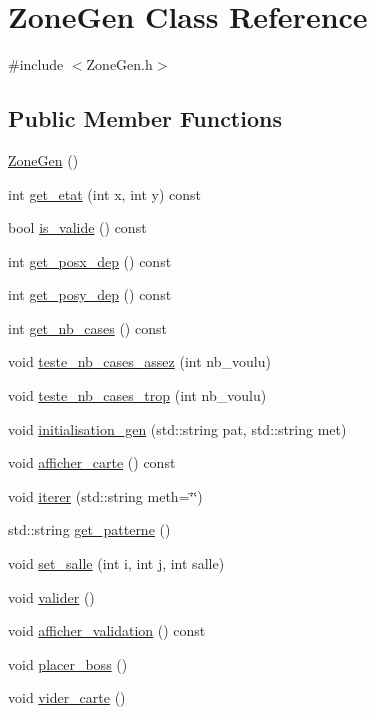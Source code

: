 \hypertarget{classZoneGen}{}\section{Zone\+Gen Class Reference}
\label{classZoneGen}


{\ttfamily \#include $<$Zone\+Gen.\+h$>$}

\subsection*{Public Member Functions}
\begin{DoxyCompactItemize}
\item 
\hyperlink{classZoneGen_aae2af3fc6b6db23a7b1f7091115ef392}{Zone\+Gen} ()
\item 
int \hyperlink{classZoneGen_a893e3c5d0ae5ecc50bf19a5d90e89b45}{get\+\_\+etat} (int x, int y) const 
\item 
bool \hyperlink{classZoneGen_a0e073b705a18999388b0b85b7c11a080}{is\+\_\+valide} () const 
\item 
int \hyperlink{classZoneGen_ac64697de6f96b242b2fb191af66e1a30}{get\+\_\+posx\+\_\+dep} () const 
\item 
int \hyperlink{classZoneGen_aa8a3a729f5d2106dbb47f33aa4d8bc9a}{get\+\_\+posy\+\_\+dep} () const 
\item 
int \hyperlink{classZoneGen_a76588fc3a5d361a213ec28692b8abcdc}{get\+\_\+nb\+\_\+cases} () const 
\item 
void \hyperlink{classZoneGen_a881eb249ee86fa522c58e7f42f651c85}{teste\+\_\+nb\+\_\+cases\+\_\+assez} (int nb\+\_\+voulu)
\item 
void \hyperlink{classZoneGen_a47825d838930c2f8657044353767f222}{teste\+\_\+nb\+\_\+cases\+\_\+trop} (int nb\+\_\+voulu)
\item 
void \hyperlink{classZoneGen_aa08565e6eb38911c72143aacfced7b91}{initialisation\+\_\+gen} (std\+::string pat, std\+::string met)
\item 
void \hyperlink{classZoneGen_a79aa554fa5bee5bd1e0af2a1a505fa57}{afficher\+\_\+carte} () const 
\item 
void \hyperlink{classZoneGen_a63dfaff24d4686702b22937606da1e04}{iterer} (std\+::string meth=\char`\"{}\char`\"{})
\item 
std\+::string \hyperlink{classZoneGen_a20afde8860019abd7889ad39c5d5fc81}{get\+\_\+patterne} ()
\item 
void \hyperlink{classZoneGen_aa03a1c3ef5639b0cde15811db92ed3d7}{set\+\_\+salle} (int i, int j, int salle)
\item 
void \hyperlink{classZoneGen_ad0f167f538f4e9f3e12908421297250f}{valider} ()
\item 
void \hyperlink{classZoneGen_a57bde599d7912da9ee574d5f94c3ea48}{afficher\+\_\+validation} () const 
\item 
void \hyperlink{classZoneGen_a2e14ba96367ade514d250c4ae1aa5025}{placer\+\_\+boss} ()
\item 
void \hyperlink{classZoneGen_ab288110fafd009f569ab27d65d35b3ed}{vider\+\_\+carte} ()
\end{DoxyCompactItemize}


